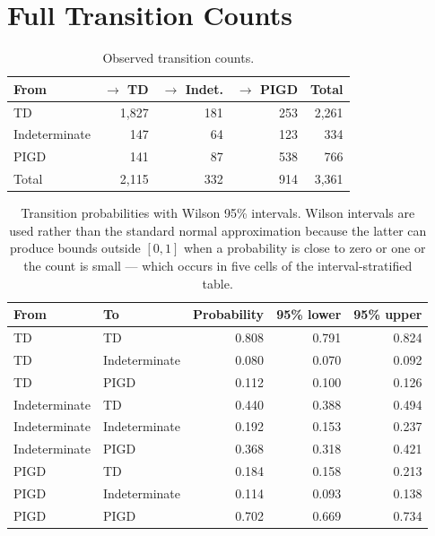 \documentclass[11pt,a4paper]{article}
\begin{document}
\section{Full Transition Counts}

\begin{table}[H]
\centering
\begin{tabular}{@{}lrrrr@{}}
\toprule
\textbf{From} & \textbf{$\rightarrow$ TD} & \textbf{$\rightarrow$ Indet.} & \textbf{$\rightarrow$ PIGD} & \textbf{Total} \\
\midrule
TD            & 1{,}827 & 181 & 253 & 2{,}261 \\
Indeterminate & \phantom{1,}147 & \phantom{1}64 & 123 & \phantom{1,}334 \\
PIGD          & \phantom{1,}141 & \phantom{1}87 & 538 & \phantom{1,}766 \\
\midrule
Total         & 2{,}115 & 332 & 914 & 3{,}361 \\
\bottomrule
\end{tabular}
\caption{Observed transition counts.}
\end{table}

\begin{table}[H]
\centering
\begin{tabular}{@{}llrrr@{}}
\toprule
\textbf{From} & \textbf{To} & \textbf{Probability} & \textbf{95\% lower} & \textbf{95\% upper} \\
\midrule
TD & TD                       & 0.808 & 0.791 & 0.824 \\
TD & Indeterminate            & 0.080 & 0.070 & 0.092 \\
TD & PIGD                     & 0.112 & 0.100 & 0.126 \\
Indeterminate & TD            & 0.440 & 0.388 & 0.494 \\
Indeterminate & Indeterminate & 0.192 & 0.153 & 0.237 \\
Indeterminate & PIGD          & 0.368 & 0.318 & 0.421 \\
PIGD & TD                     & 0.184 & 0.158 & 0.213 \\
PIGD & Indeterminate          & 0.114 & 0.093 & 0.138 \\
PIGD & PIGD                   & 0.702 & 0.669 & 0.734 \\
\bottomrule
\end{tabular}
\caption{Transition probabilities with Wilson 95\% intervals. Wilson intervals
are used rather than the standard normal approximation because the latter can
produce bounds outside $[0,1]$ when a probability is close to zero or one or the
count is small --- which occurs in five cells of the interval-stratified table.}
\end{table}
\end{document}
